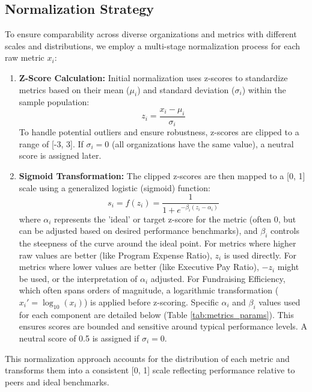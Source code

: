 \documentclass[12pt]{article}
\begin{document}
\subsection{Normalization Strategy} %
To ensure comparability across diverse organizations and metrics with different scales and distributions, we employ a multi-stage normalization process for each raw metric $x_i$:
\begin{enumerate}
    \item \textbf{Z-Score Calculation:} Initial normalization uses z-scores to standardize metrics based on their mean ($\mu_i$) and standard deviation ($\sigma_i$) within the sample population:
        \begin{equation} \label{eq:z_score}
            z_i = \frac{x_i - \mu_i}{\sigma_i}
        \end{equation}
        To handle potential outliers and ensure robustness, z-scores are clipped to a range of [-3, 3]. If $\sigma_i = 0$ (all organizations have the same value), a neutral score is assigned later.
    \item \textbf{Sigmoid Transformation:} The clipped z-scores are then mapped to a [0, 1] scale using a generalized logistic (sigmoid) function:
        \begin{equation} \label{eq:sigmoid}
            s_i = f(z_i) = \frac{1}{1 + e^{-\beta_i(z_i - \alpha_i)}}
        \end{equation}
        where $\alpha_i$ represents the 'ideal' or target z-score for the metric (often 0, but can be adjusted based on desired performance benchmarks), and $\beta_i$ controls the steepness of the curve around the ideal point. For metrics where higher raw values are better (like Program Expense Ratio), $z_i$ is used directly. For metrics where lower values are better (like Executive Pay Ratio), $-z_i$ might be used, or the interpretation of $\alpha_i$ adjusted. For Fundraising Efficiency, which often spans orders of magnitude, a logarithmic transformation ($x_i' = \log_{10}(x_i)$) is applied before z-scoring. Specific $\alpha_i$ and $\beta_i$ values used for each component are detailed below (Table \ref{tab:metrics_params}). This ensures scores are bounded and sensitive around typical performance levels. A neutral score of 0.5 is assigned if $\sigma_i=0$.
\end{enumerate}
This normalization approach accounts for the distribution of each metric and transforms them into a consistent [0, 1] scale reflecting performance relative to peers and ideal benchmarks.
\end{document}
